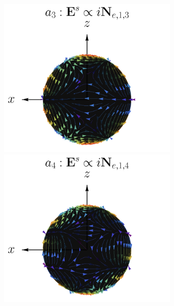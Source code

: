 \begin{figure}[h!]
\begin{subfigure}{.9\linewidth}
			\includegraphics[scale=.25]{1-Teoria/figs/Ne13_static_crop.png}%
			\includegraphics[scale=.25]{1-Teoria/figs/Ne14_static_crop.png}%
		\end{subfigure}\\
		\hspace{-4em}	
		\begin{subfigure}{.05\linewidth}\vspace{-3.25cm}\label{figs:MagneticMultipoles} \caption{ } \end{subfigure}
		\hspace{-3em}

\end{figure}
